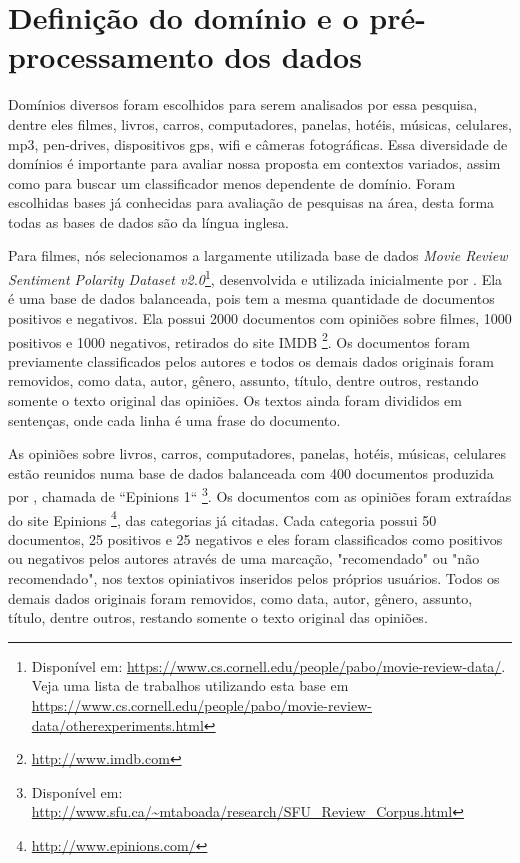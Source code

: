 
\section{Definição do domínio e o pré-processamento dos dados}

 Domínios diversos foram escolhidos para serem analisados por essa pesquisa, dentre eles filmes, livros, carros, computadores, panelas, hotéis, músicas, celulares, mp3, pen-drives, dispositivos gps, wifi e câmeras fotográficas. Essa diversidade de domínios é importante para avaliar nossa proposta em contextos variados, assim como para buscar um classificador menos dependente de domínio. Foram escolhidas bases já conhecidas para avaliação de pesquisas na área, desta forma todas as bases de dados são da língua inglesa.

Para filmes, nós selecionamos a largamente utilizada base de dados \textit{Movie Review Sentiment Polarity Dataset v2.0}\footnote{Disponível em: \url{https://www.cs.cornell.edu/people/pabo/movie-review-data/}. Veja uma lista de trabalhos utilizando esta base em \url{https://www.cs.cornell.edu/people/pabo/movie-review-data/otherexperiments.html}}, desenvolvida e utilizada inicialmente por \cite{pang2004sentimental}. Ela é uma base de dados balanceada, pois tem a mesma quantidade de documentos positivos e negativos. Ela possui 2000 documentos com opiniões sobre filmes, 1000 positivos e 1000 negativos, retirados do site IMDB \footnote{\url{http://www.imdb.com}}. Os documentos foram previamente classificados pelos autores e todos os demais dados originais foram removidos, como data, autor, gênero, assunto, título, dentre outros, restando somente o texto original das opiniões. Os textos ainda foram divididos em sentenças, onde cada linha é uma frase do documento.

As opiniões sobre livros, carros, computadores, panelas, hotéis, músicas, celulares estão reunidos numa base de dados balanceada com 400 documentos  produzida por \cite{taboada2011lexicon}, chamada de ``Epinions 1`` \footnote{Disponível em: \url{http://www.sfu.ca/~mtaboada/research/SFU_Review_Corpus.html}}. Os documentos com as opiniões foram extraídas do site Epinions \footnote{\url{http://www.epinions.com/}}, das categorias já citadas. Cada categoria possui 50 documentos, 25 positivos e 25 negativos e eles foram classificados como positivos ou negativos pelos autores através de uma marcação, "recomendado" ou "não recomendado", nos textos opiniativos inseridos pelos próprios usuários. Todos os demais dados originais foram removidos, como data, autor, gênero, assunto, título, dentre outros, restando somente o texto original das opiniões.

